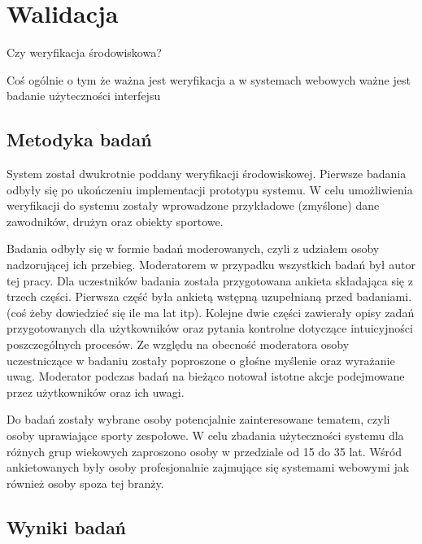 \chapter{Walidacja}

Czy weryfikacja środowiskowa?

Coś ogólnie o tym że ważna jest weryfikacja a w systemach webowych ważne jest badanie użyteczności interfejsu

\section{Metodyka badań}

System został dwukrotnie poddany weryfikacji środowiskowej. Pierwsze badania odbyły się po ukończeniu implementacji prototypu systemu. W celu umożliwienia weryfikacji do systemu zostały wprowadzone przykładowe (zmyślone) dane zawodników, drużyn oraz obiekty sportowe.

Badania odbyły się w formie badań moderowanych, czyli z udziałem osoby nadzorującej ich przebieg. Moderatorem w przypadku wszystkich badań był autor tej pracy. Dla uczestników badania została przygotowana ankieta składająca się z trzech części. Pierwsza część była ankietą wstępną uzupełnianą przed badaniami. (coś żeby dowiedzieć się ile ma lat itp). Kolejne dwie części zawierały opisy zadań przygotowanych dla użytkowników oraz pytania kontrolne dotyczące intuicyjności poszczególnych procesów. Ze względu na obecność moderatora osoby uczestniczące w badaniu zostały poproszone o głośne myślenie oraz wyrażanie uwag. Moderator podczas badań na bieżąco notował istotne akcje podejmowane przez użytkowników oraz ich uwagi.

Do badań zostały wybrane osoby potencjalnie zainteresowane tematem, czyli osoby uprawiające sporty zespołowe. W celu zbadania użyteczności systemu dla różnych grup wiekowych zaproszono osoby w przedziale od 15 do 35 lat. Wśród ankietowanych były osoby profesjonalnie zajmujące się systemami webowymi jak również osoby spoza tej branży.

\section{Wyniki badań}

